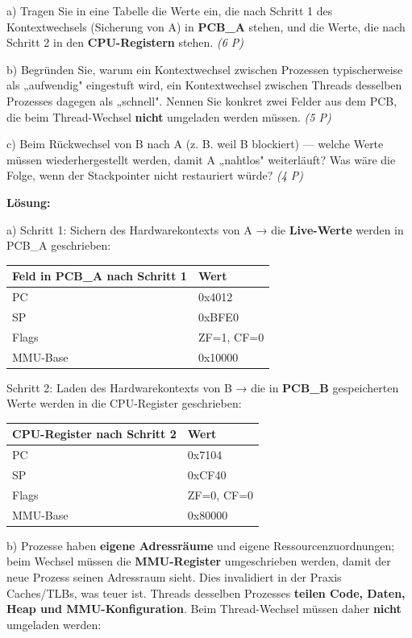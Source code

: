 \documentclass[11pt, a4paper]{article}
\begin{document}
a) Tragen Sie in eine Tabelle die Werte ein, die nach Schritt 1 des Kontextwechsels (Sicherung von A) in \textbf{PCB\_A} stehen, und die Werte, die nach Schritt 2 in den \textbf{CPU-Registern} stehen. \textit{(6 P)}


b) Begründen Sie, warum ein Kontextwechsel zwischen Prozessen typischerweise als „aufwendig" eingestuft wird, ein Kontextwechsel zwischen Threads desselben Prozesses dagegen als „schnell". Nennen Sie konkret zwei Felder aus dem PCB, die beim Thread-Wechsel \textbf{nicht} umgeladen werden müssen. \textit{(5 P)}


c) Beim Rückwechsel von B nach A (z. B. weil B blockiert) — welche Werte müssen wiederhergestellt werden, damit A „nahtlos" weiterläuft? Was wäre die Folge, wenn der Stackpointer nicht restauriert würde? \textit{(4 P)}


\textbf{Lösung:}


a) Schritt 1: Sichern des Hardwarekontexts von A → die \textbf{Live-Werte} werden in PCB\_A geschrieben:



{\small
\begin{tabularx}{\linewidth}{XX}
\hline
\rowcolor{tableheadbg}
{\color{white}\textbf{Feld in PCB\_A nach Schritt 1}} & {\color{white}\textbf{Wert}} \\[2pt]
\hline
\endhead
\hline
\endfoot
PC & 0x4012 \\
SP & 0xBFE0 \\
Flags & ZF=1, CF=0 \\
MMU-Base & 0x10000 \\
\end{tabularx}
}


Schritt 2: Laden des Hardwarekontexts von B → die in \textbf{PCB\_B} gespeicherten Werte werden in die CPU-Register geschrieben:



{\small
\begin{tabularx}{\linewidth}{XX}
\hline
\rowcolor{tableheadbg}
{\color{white}\textbf{CPU-Register nach Schritt 2}} & {\color{white}\textbf{Wert}} \\[2pt]
\hline
\endhead
\hline
\endfoot
PC & 0x7104 \\
SP & 0xCF40 \\
Flags & ZF=0, CF=0 \\
MMU-Base & 0x80000 \\
\end{tabularx}
}


b) Prozesse haben \textbf{eigene Adressräume} und eigene Ressourcenzuordnungen; beim Wechsel müssen die \textbf{MMU-Register} umgeschrieben werden, damit der neue Prozess seinen Adressraum sieht. Dies invalidiert in der Praxis Caches/TLBs, was teuer ist. Threads desselben Prozesses \textbf{teilen Code, Daten, Heap und MMU-Konfiguration}. Beim Thread-Wechsel müssen daher \textbf{nicht} umgeladen werden:
\end{document}
